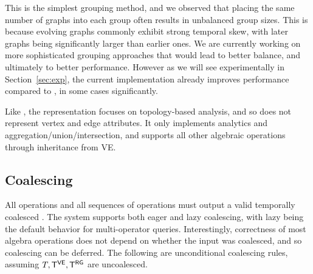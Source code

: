 This is the simplest grouping method, and we observed that placing the
same number of graphs into each group often results in unbalanced
group sizes.  This is because evolving graphs commonly exhibit strong
temporal skew, with later graphs being significantly larger than earlier
ones.  We are currently working on more sophisticated grouping
approaches that would lead to better balance, and ultimately to better
performance.  However as we will see experimentally in
Section~\ref{sec:exp}, the current \hg implementation already improves
performance compared to \og, in some cases significantly.

Like \og, the \hg representation focuses on topology-based analysis, and
so does not represent vertex and edge attributes. It only implements
analytics and aggregation/union/intersection, and supports all other
algebraic operations through inheritance from VE.

\subsection{Coalescing}
\label{sec:sys:coal}


All operations and all sequences of operations must output a valid
temporally coalesced \tg.  The \ql system supports both eager and lazy
coalescing, with lazy being the default behavior for multi-operator
queries.  Interestingly, correctness of most \tg algebra operations
does not depend on whether the input was coalesced, and so coalescing
can be deferred.  The following are unconditional coalescing rules,
assuming $T, \mathsf{T^{VE}}, \mathsf{T^{RG}}$ are uncoalesced.


